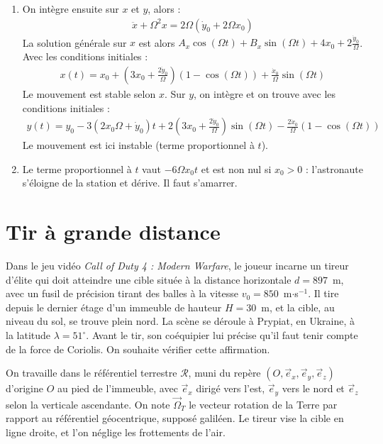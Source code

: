 \begin{correction}
\begin{enumerate}
\item On intègre ensuite sur $x$ et $y$, alors :
\begin{align*}
	\ddot{x}+\Omega^2x=2\Omega(\dot{y}_0+2\Omega x_0)
\end{align*}
La solution générale sur $x$ est alors $A_x\cos(\Omega t)+B_x\sin(\Omega t)+4x_0+2\frac{\dot{y}_0}{\Omega}$. Avec les conditions initiales :
\begin{align*}
	x(t)=x_0+\left(3x_0+\frac{2\dot{y}_0}{\Omega}\right)(1-\cos(\Omega t))+\frac{\dot{x}_0}{\Omega}\sin(\Omega t)
\end{align*}
Le mouvement est stable selon $x$. Sur $y$, on intègre et on trouve avec les conditions initiales :
\begin{align*}
	y(t)=y_0-3(2x_0\Omega+\dot{y}_0)t+2\left(3x_0+\frac{2\dot{y}_0}{\Omega}\right)\sin(\Omega t)-\frac{2\dot{x}_0}{\Omega}(1-\cos(\Omega t))
\end{align*}
Le mouvement est ici instable (terme proportionnel à $t$).

	\item Le terme proportionnel à $t$ vaut $-6\Omega x_0t$ et est non nul si $x_0>0$ : l'astronaute s'éloigne de la station et dérive. Il faut s'amarrer.
	
\end{enumerate}

\end{correction}

\newpage

\section{Tir à grande distance}

Dans le jeu vidéo \textit{Call of Duty 4 : Modern Warfare}, le joueur incarne un tireur d'élite qui doit atteindre une cible située à la distance horizontale $d=897$~m, avec un fusil de précision tirant des balles à la vitesse $v_0=850$~m$\cdot$s$^{-1}$. Il tire depuis le dernier étage d'un immeuble de hauteur $H=30$~m, et la cible, au niveau du sol, se trouve plein nord. La scène se déroule à Prypiat, en Ukraine, à la latitude $\lambda=51^\circ$. Avant le tir, son coéquipier lui précise qu'il faut tenir compte de la force de Coriolis. On souhaite vérifier cette affirmation.

On travaille dans le référentiel terrestre $\mathcal{R}$, muni du repère $(O,\vec{e}_x,\vec{e}_y,\vec{e}_z)$ d'origine $O$ au pied de l'immeuble, avec $\vec{e}_x$ dirigé vers l'est, $\vec{e}_y$ vers le nord et $\vec{e}_z$ selon la verticale ascendante. On note $\vec{\Omega}_T$ le vecteur rotation de la Terre par rapport au référentiel géocentrique, supposé galiléen. Le tireur vise la cible en ligne droite, et l'on néglige les frottements de l'air.


